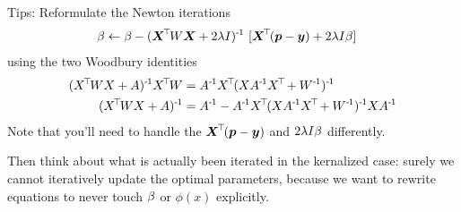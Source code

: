 Tips: Reformulate the Newton iterations
\begin{align}
\beta
&\gets \beta
 - (\boldsymbol X^{\!\top\!} W \boldsymbol X + 2 \lambda I)^{{\hspace*{-.0pt}\text{\rm -}\hspace*{-.5pt}}1}~
[\boldsymbol X^{\!\top\!} (\boldsymbol p - \boldsymbol y) + 2\lambda I \beta] 
\end{align}
using the two Woodbury identities
\begin{align}
(X^\T W X + A)^\1 X^\T W
&= A^\1 X^\T (X A^\1 X^\T + W^\1)^\1 \\
(X^\T WX+A)^\1
&= A^\1 - A^\1 X^\T (XA^\1X^\T+W^\1)^\1 X A^\1
\end{align}
Note that you'll need to handle the $\boldsymbol X^{\!\top\!} (\boldsymbol p - \boldsymbol y)$ and
$2\lambda I \beta$ differently.

Then think about what is actually been iterated in the kernalized
case: surely we cannot iteratively update the optimal parameters,
because we want to rewrite equations to never touch $\beta$ or $\phi(x)$
explicitly.

\exerfoot

